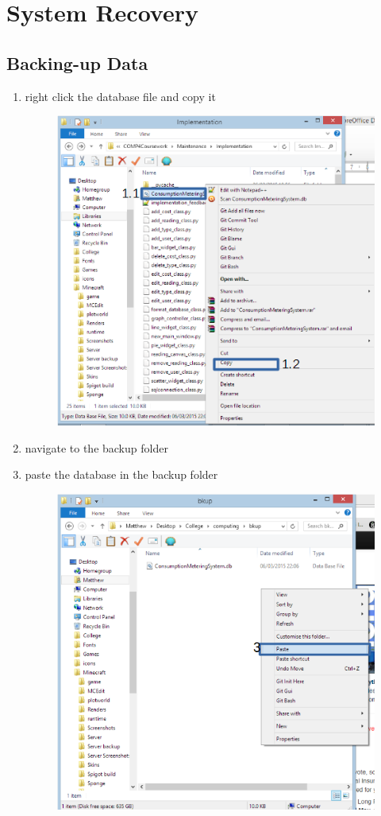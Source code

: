 \section{System Recovery}

\subsection{Backing-up Data}
\begin{enumerate}
	\item right click the database file and copy it
\begin{figure}[H]
	\includegraphics{./manual/images/backup-step-1.png}
\end{figure}
	\item navigate to the backup folder
	\item paste the database in the backup folder
\begin{figure}[H]
	\includegraphics{./manual/images/backup-step-3.png}

\end{figure}
\end{enumerate}
